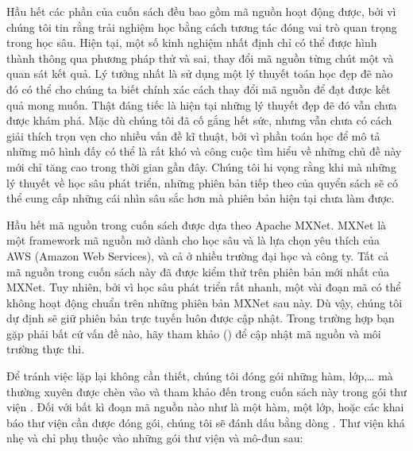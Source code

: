 \documentclass[letterpaper,11pt,english]{sphinxmanual}
\begin{document}
Hầu hết các phần của cuốn sách đều bao gồm mã nguồn hoạt động được, bởi
vì chúng tôi tin rằng trải nghiệm học bằng cách tương tác đóng vai trò
quan trọng trong học sâu. Hiện tại, một số kinh nghiệm nhất định chỉ có
thể được hình thành thông qua phương pháp thử và sai, thay đổi mã nguồn
từng chút một và quan sát kết quả. Lý tưởng nhất là sử dụng một lý
thuyết toán học đẹp đẽ nào đó có thể cho chúng ta biết chính xác cách
thay đổi mã nguồn để đạt được kết quả mong muốn. Thật đáng tiếc là hiện
tại những lý thuyết đẹp đẽ đó vẫn chưa được khám phá. Mặc dù chúng tôi
đã cố gắng hết sức, nhưng vẫn chưa có cách giải thích trọn vẹn cho nhiều
vấn đề kĩ thuật, bởi vì phần toán học để mô tả những mô hình đấy có thể
là rất khó và công cuộc tìm hiểu về những chủ đề này mới chỉ tăng cao
trong thời gian gần đây. Chúng tôi hi vọng rằng khi mà những lý thuyết
về học sâu phát triển, những phiên bản tiếp theo của quyển sách sẽ có
thể cung cấp những cái nhìn sâu sắc hơn mà phiên bản hiện tại chưa làm
được.



Hầu hết mã nguồn trong cuốn sách được dựa theo Apache MXNet. MXNet là
một framework mã nguồn mở dành cho học sâu và là lựa chọn yêu thích của
AWS (Amazon Web Services), và cả ở nhiều trường đại học và công ty. Tất
cả mã nguồn trong cuốn sách này đã được kiểm thử trên phiên bản mới nhất
của MXNet. Tuy nhiên, bởi vì học sâu phát triển rất nhanh, một vài đoạn
mã  có thể không hoạt động chuẩn trên những
phiên bản MXNet sau này. Dù vậy, chúng tôi dự định sẽ giữ phiên bản trực
tuyến luôn được cập nhật. Trong trường hợp bạn gặp phải bất cứ vấn đề
nào, hãy tham khảo {\hyperref[\detokenize{chapter_install/index_vn:chap-installation}]{}} () để cập nhật mã nguồn và
môi trường thực thi.



Để tránh việc lặp lại không cần thiết, chúng tôi đóng gói những hàm,
lớp,… mà thường xuyên được chèn vào và tham khảo đến trong cuốn sách này
trong gói thư viện . Đối với bất kì đoạn mã nguồn nào như là một
hàm, một lớp, hoặc các khai báo thư viện cần được đóng gói, chúng tôi sẽ
đánh dấu bằng dòng
.
Thư viện  khá nhẹ và chỉ phụ thuộc vào những gói thư viện và
mô-đun sau:
\end{document}
